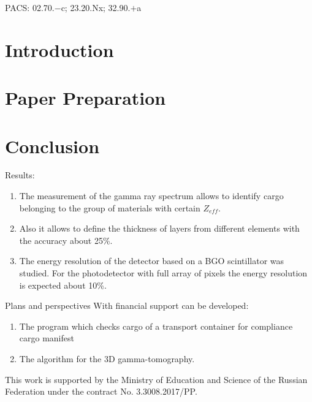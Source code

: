 \documentclass[a4paper]{panl}
\begin{document}
\noindent
PACS: 02.70.$-$c; 23.20.Nx; 32.90.$+$a

\label{sec:intro}
\section*{Introduction}


\label{sec:preparation}
\section*{Paper Preparation}

\section*{Conclusion}

Results:   
    \begin{enumerate}
        \item The measurement of the gamma ray spectrum allows to identify cargo belonging to the group of materials with certain $Z_{eff}$.
        \item Also it allows to define the thickness of layers from different elements with the accuracy about 25\%.
        \item The energy resolution of the detector based on a BGO scintillator was studied.  For the photodetector with full array of pixels the energy resolution is expected about 10\%.
    \end{enumerate}
Plans and perspectives
    With financial support can be developed:
    \begin{enumerate}
        \item The program which checks cargo of a transport container  for compliance cargo manifest
        \item The algorithm for the 3D gamma-tomography.
    \end{enumerate}

This work is supported by the Ministry of Education and Science of the Russian Federation under the contract No. 3.3008.2017/PP.






\end{document}
